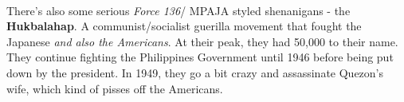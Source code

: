 \documentclass[a4paper]{article}
\begin{document}
\\
There's also some serious \textit{Force 136}/ MPAJA styled shenanigans - the \textbf{Hukbalahap}. A communist/socialist guerilla movement that fought the Japanese \textit{and also the Americans}. At their peak, they had 50,000 to their name. They continue fighting the Philippines Government until 1946 before being put down by the president. In 1949, they go a bit crazy and assassinate Quezon's wife, which kind of pisses off the Americans.
\end{document}
